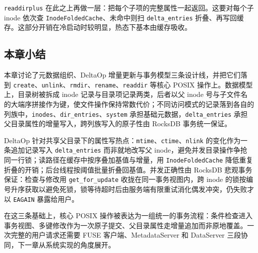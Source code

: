 \texttt{readdirplus} 在此之上再做一层：把每个子项的完整属性一起返回。这要对每个子 inode 依次查 \texttt{InodeFoldedCache}、未命中则扫 \texttt{delta\_entries} 折叠、再写回缓存。这部分开销在冷启动时较明显，热态下基本由缓存吸收。

\subsection{本章小结}

本章讨论了元数据组织、DeltaOp 增量更新与事务模型三条设计线，并把它们落到 \texttt{create}、\texttt{unlink}、\texttt{rmdir}、\texttt{rename}、\texttt{readdir} 等核心 POSIX 操作上。数据模型上，目录树被拆成 inode 记录与目录项记录两类，后者以父 inode 号与子文件名的大端序拼接作为键，使文件操作保持常数代价；不同访问模式的记录落到各自的列族中，\texttt{inodes}、\texttt{dir\_entries}、\texttt{system} 承担基础元数据，\texttt{delta\_entries} 承担父目录属性的增量写入，跨列族写入的原子性由 RocksDB 事务统一保证。

DeltaOp 针对共享父目录下的属性写热点：\texttt{mtime}、\texttt{ctime}、\texttt{nlink} 的变化作为一条追加记录写入 \texttt{delta\_entries} 而非就地改写父 inode，避免并发目录操作争抢同一行锁；读路径在缓存中按序叠加基值与增量，用 \texttt{InodeFoldedCache} 降低重复折叠的开销；后台线程按阈值批量折叠回基值。并发正确性由 RocksDB 悲观事务保证：检查与修改用 \texttt{get\_for\_update} 收拢在同一事务视图内，跨 inode 的锁按编号升序获取以避免死锁，锁等待超时后由服务端有限重试消化偶发冲突，仍失败才以 \texttt{EAGAIN} 暴露给用户。

在这三条基础上，核心 POSIX 操作被表达为一组统一的事务流程：条件检查进入事务视图、多键修改作为一次原子提交、父目录属性走增量追加而非原地覆盖。一次完整的用户请求还需要 FUSE 客户端、MetadataServer 和 DataServer 三段协同，下一章从系统实现的角度展开。
